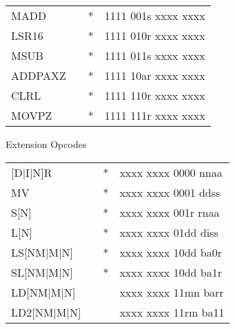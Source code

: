 \documentclass[oneside,english,a4paper,10pt,oneside,openany,final]{memoir}
\begin{document}
\begin{center}
\begin{longtable}{TllT}
MADD        &          & *  & 1111 001s xxxx xxxx                     \\
LSR16       &          & *  & 1111 010r xxxx xxxx                     \\
MSUB        &          & *  & 1111 011s xxxx xxxx                     \\
ADDPAXZ     &          & *  & 1111 10ar xxxx xxxx                     \\
CLRL        &          & *  & 1111 110r xxxx xxxx                     \\
MOVPZ       &          & *  & 1111 111r xxxx xxxx
\end{longtable}
\end{center}

\begin{center}
Extension Opcodes
\begin{longtable}{TllT}
[D|I|N]R    &          & *  & xxxx xxxx 0000 nnaa \\
MV          &          & *  & xxxx xxxx 0001 ddss \\
S[N]        &          & *  & xxxx xxxx 001r rnaa \\
L[N]        &          & *  & xxxx xxxx 01dd diss \\
LS[NM|M|N]  &          & *  & xxxx xxxx 10dd ba0r \\
SL[NM|M|N]  &          & *  & xxxx xxxx 10dd ba1r \\
LD[NM|M|N]  &          &    & xxxx xxxx 11mn barr \\
LD2[NM|M|N] &          &    & xxxx xxxx 11rm ba11
\end{longtable}
\end{center}
\end{document}
